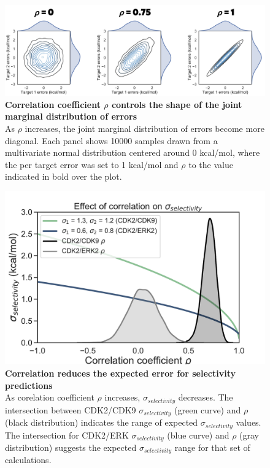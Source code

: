 \documentclass[9pt,lineno]{elife-modified} %
\begin{document}
\begin{figure}[h]
\begin{fullwidth}
\begin{centering}
\includegraphics[width=1.0\linewidth]{figures/supp_2.png}
\end{centering}
\caption{
\label{fig:sup-figure-2}
{\bf Correlation coefficient $\rho$ controls the shape of the joint marginal distribution of errors} \\
As $\rho$ increases, the joint marginal distribution of errors become more diagonal. Each panel shows 10000 samples drawn from a multivariate normal distribution centered around 0 kcal/mol, where the per target error was set to 1 kcal/mol and $\rho$ to the value indicated in bold over the plot. 
}
\end{fullwidth}
\end{figure}

\begin{figure}[h]
\begin{fullwidth}
\begin{centering}
\includegraphics[width=1.0\linewidth]{figures/supp_figure3.pdf}
\end{centering}
\caption{
\label{fig:sup-figure-3}
{\bf Correlation reduces the expected error for selectivity predictions} \\
As corelation coefficient $\rho$ increases, $\sigma_{selectivity}$ decreases. The intersection between CDK2/CDK9 $\sigma_{selectivity}$ (green curve) and $\rho$ (black distribution) indicates the range of expected $\sigma_{selectivity}$ values. The intersection for CDK2/ERK $\sigma_{selectivity}$ (blue curve) and $\rho$ (gray distribution) suggests the expected $\sigma_{selectivity}$ range for that set of calculations. 
}
\end{fullwidth}
\end{figure}
\end{document}
